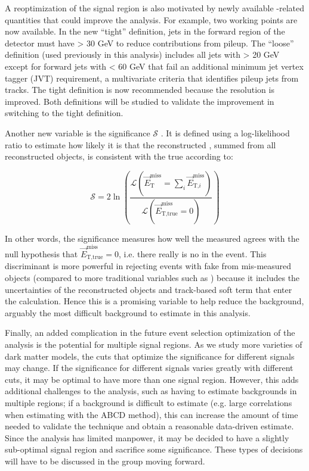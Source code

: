 A reoptimization of the signal region is also motivated by newly available \etmiss-related quantities that could improve the \monoZ analysis. For example, two \etmiss working points are now available. In the new ``tight'' \etmiss definition, jets in the forward region of the detector must have \pt > 30 GeV to reduce contributions from pileup. The ``loose'' definition (used previously in this analysis) includes all jets with \pt > 20 GeV except for forward jets with \pt < 60 GeV that fail an additional minimum jet vertex tagger (JVT) requirement, a multivariate criteria that identifies pileup jets from tracks. The tight definition is now recommended because the \etmiss resolution is improved. Both definitions will be studied to validate the improvement in switching to the tight definition.

Another new variable is the \etmiss significance $\mathcal{S}$ \cite{Schaefer:2294922}. It is defined using a log-likelihood ratio to estimate how likely it is that the reconstructed \etmissvec, summed from all reconstructed objects, is consistent with the true \etmissvec according to:

\begin{equation}
\mathcal{S} = 2 \ln \left( \frac{\mathcal{L}(\vec{E}_\text{T}^\text{miss} = \sum_i \vec{E}_{\text{T,}i}^\text{miss})}{\mathcal{L}(\vec{E}_\text{T,true}^\text{miss} = 0)} \right)
\end{equation}

\noindent In other words, the significance measures how well the measured \etmissvec agrees with the null hypothesis that $\vec{E}_\text{T,true}^\text{miss} = 0$, i.e. there really is no \etmiss in the event. This discriminant is more powerful in rejecting events with fake \etmiss from mis-measured objects (compared to more traditional variables such as \etmissht) because it includes the uncertainties of the reconstructed objects and track-based soft term that enter the \etmiss calculation. Hence this is a promising variable to help reduce the \Zjets background, arguably the most difficult background to estimate in this analysis.

Finally, an added complication in the future event selection optimization of the analysis is the potential for multiple signal regions. As we study more varieties of dark matter models, the cuts that optimize the significance for different signals may change. If the significance for different signals varies greatly with different cuts, it may be optimal to have more than one signal region. However, this adds additional challenges to the analysis, such as having to estimate backgrounds in multiple regions; if a background is difficult to estimate (e.g. large correlations when estimating \Zjets with the ABCD method), this can increase the amount of time needed to validate the technique and obtain a reasonable data-driven estimate. Since the analysis has limited manpower, it may be decided to have a slightly sub-optimal signal region and sacrifice some significance. These types of decisions will have to be discussed in the group moving forward.


